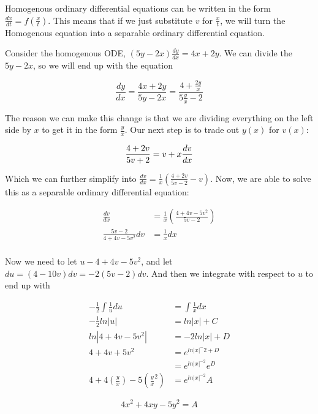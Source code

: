     Homogenous ordinary differential equations can be written in the form $\frac{dx}{dt}=f\left(\frac{x}{t}\right)$. This means that if we just substitute $v$ for $\frac{x}{t}$, we will turn the Homogenous equation into a separable ordinary differential equation.

    \begin{problem}
      Consider the homogenous ODE, $(5y-2x)\frac{dy}{dx}=4x+2y$. We can divide the $5y-2x$, so we will end up with the equation

      \[
        \frac{dy}{dx}=\frac{4x+2y}{5y-2x}=\frac{4+\frac{2y}{x}}{5\frac{y}{x}-2}
      \]

      The reason we can make this change is that we are dividing everything on the left side by $x$ to get it in the form $\frac{y}{x}$. Our next step is to trade out $y(x)$ for $v(x)$:

      \[
        \frac{4+2v}{5v+2}=v+x\frac{dv}{dx}\\
      \]

      Which we can further simplify into $\frac{dv}{dx}=\frac{1}{x}\left(\frac{4+2v}{5v-2}-v\right)$. Now, we are able to solve this as a separable ordinary differential equation:

      \[
        \begin{aligned}
          \frac{dv}{dx}&=\frac{1}{x}\left(\frac{4+4v-5v^2}{5v-2}\right)\\
          \frac{5v-2}{4+4v-5v^2}dv&=\frac{1}{x}dx\\
        \end{aligned}
      \]

      Now we need to let $u-4+4v-5v^2$, and let $du=(4-10v)dv=-2(5v-2)dv$. And then we integrate with respect to $u$ to end up with 

      \[
        \begin{aligned}
          -\frac{1}{2}\int\frac{1}{u}du&=\int\frac{1}{x}dx\\
          -\frac{1}{2}ln|u|&=ln|x|+C\\
          ln|4+4v-5v^2|&=-2ln|x|+D\\
          4+4v+5v^2&=e^{ln|x|^-2+D}\\
          &=e^{ln|x|^{-2}}e^D\\
          4+4\left(\frac{y}{x}\right)-5\left(\frac{y}{x}^2\right)&=e^{ln|x|^{-2}}A
        \end{aligned}
      \]

      \[
        \boxed{4x^2+4xy-5y^2=A}
      \]
    \end{problem}

